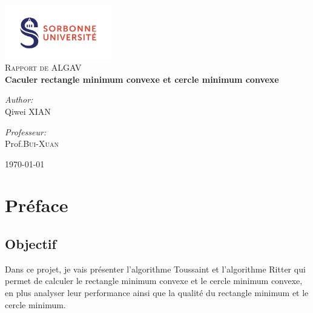 \documentclass[14px]{article}
\begin{document}
\setlength{\parindent}{0pt}
\begin{titlepage}

	\begin{center}
		\includegraphics[width=0.35\textwidth]{logo.png}\\[1cm]

		\textsc{\Large Rapport de ALGAV}\\[0.5cm]


		{ \huge \bfseries Caculer rectangle minimum convexe et cercle minimum convexe}\\[0.4cm]

		\begin{minipage}{0.4\textwidth}
			\begin{flushleft} \large
				\emph{Author:}\\
				Qiwei \textsc{XIAN}
			\end{flushleft}
		\end{minipage}
		\begin{minipage}{0.4\textwidth}
			\begin{flushright} \large
				\emph{Professeur:} \\
				Prof.\textsc{Bui-Xuan}
			\end{flushright}
		\end{minipage}

		\vfill
		{\large \today}
	\end{center}

\end{titlepage}
\clearpage

\tableofcontents
\thispagestyle{empty}
\clearpage

\pagestyle{fancy}
\rhead{\thepage}
\fancyfoot{}

\section{Préface}

\subsection{Objectif}
Dans ce projet, je vais présenter l'algorithme Toussaint et l'algorithme Ritter qui permet de calculer le rectangle minimum convexe et le cercle minimum convexe, en plus analyser leur performance ainsi que la qualité du rectangle minimum et le cercle minimum.
\end{document}
